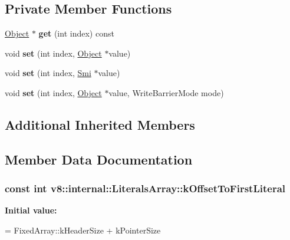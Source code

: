 \subsection*{Private Member Functions}
\begin{DoxyCompactItemize}
\item 
\hyperlink{classv8_1_1internal_1_1_object}{Object} $\ast$ {\bfseries get} (int index) const \hypertarget{classv8_1_1internal_1_1_literals_array_a60516e99538757abbd6ce1791554d7d9}{}\label{classv8_1_1internal_1_1_literals_array_a60516e99538757abbd6ce1791554d7d9}

\item 
void {\bfseries set} (int index, \hyperlink{classv8_1_1internal_1_1_object}{Object} $\ast$value)\hypertarget{classv8_1_1internal_1_1_literals_array_ac537e7c32f9ae20f4b06f60a10b18f6e}{}\label{classv8_1_1internal_1_1_literals_array_ac537e7c32f9ae20f4b06f60a10b18f6e}

\item 
void {\bfseries set} (int index, \hyperlink{classv8_1_1internal_1_1_smi}{Smi} $\ast$value)\hypertarget{classv8_1_1internal_1_1_literals_array_a7ed844b6f3c874b02de020503eb1d824}{}\label{classv8_1_1internal_1_1_literals_array_a7ed844b6f3c874b02de020503eb1d824}

\item 
void {\bfseries set} (int index, \hyperlink{classv8_1_1internal_1_1_object}{Object} $\ast$value, Write\+Barrier\+Mode mode)\hypertarget{classv8_1_1internal_1_1_literals_array_ae3a8c60b6c48dd4cfda9da6109909d75}{}\label{classv8_1_1internal_1_1_literals_array_ae3a8c60b6c48dd4cfda9da6109909d75}

\end{DoxyCompactItemize}
\subsection*{Additional Inherited Members}


\subsection{Member Data Documentation}
\subsubsection[{\texorpdfstring{k\+Offset\+To\+First\+Literal}{kOffsetToFirstLiteral}}]{\setlength{\rightskip}{0pt plus 5cm}const int v8\+::internal\+::\+Literals\+Array\+::k\+Offset\+To\+First\+Literal\hspace{0.3cm}{\ttfamily [static]}}\hypertarget{classv8_1_1internal_1_1_literals_array_abc9647e9ff5e0b6823e2312270115beb}{}\label{classv8_1_1internal_1_1_literals_array_abc9647e9ff5e0b6823e2312270115beb}
{\bfseries Initial value\+:}
\begin{DoxyCode}
=
      FixedArray::kHeaderSize + kPointerSize
\end{DoxyCode}



